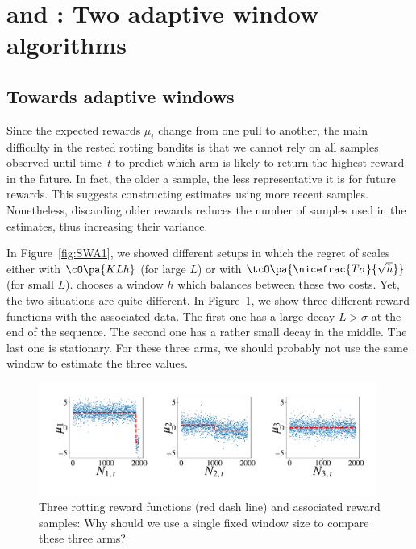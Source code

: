\section{{\FEWA} and {\RAW}: Two adaptive window algorithms}
\label{sec:algo}
%
\subsection{Towards adaptive windows}
Since the expected rewards $\mu_i$ change from one pull to another, the main difficulty in the rested rotting bandits is that we cannot rely on all samples observed until time~$t$ to predict which arm is likely to return the highest reward in the future. In fact, the older a sample, the less representative it is for future rewards. This suggests constructing estimates using more recent samples. Nonetheless, discarding older rewards reduces the number of samples used in the estimates, thus increasing their variance.

In Figure~\ref{fig:SWA1}, we showed different setups in which the regret of \wSWA scales either with $\cO\pa{KLh}$ (for large $L$) or with $\tcO\pa{\nicefrac{T\sigma}{\sqrt{h}}}$ (for small $L$). \wSWA chooses a window $h$ which balances between these two costs. Yet, the two situations are quite different. In Figure~\ref{fig: adaptive_window}, we show three different reward functions with the associated data. The first one has a large decay $L> \sigma$ at the end of the sequence. The second one has a rather small decay in the middle. The last one is stationary. For these three arms, we should probably not use the same window to estimate the three values.

\begin{figure}[h]
\centering
\includegraphics[clip, width= 0.99\textwidth, trim={ 1cm 2cm 1cm 1cm}]{2.1Rested/fig/adaptive_windows.pdf}
\caption{Three rotting reward functions (red dash line) and associated reward samples: Why should we use a single fixed window size to compare these three arms?}
\label{fig: adaptive_window}
\end{figure}




